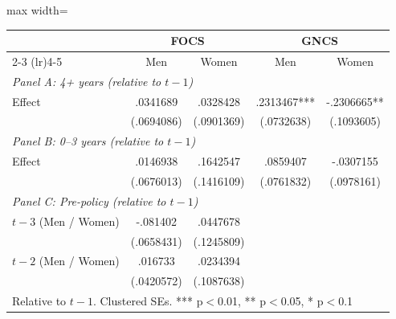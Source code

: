\begin{adjustbox}{max width=\textwidth}
\begin{tabular}{lcccc}
\toprule
 & \multicolumn{2}{c}{FOCS} & \multicolumn{2}{c}{GNCS} \\
\cmidrule(lr){2-3} \cmidrule(lr){4-5}
 & Men & Women & Men & Women \\
\midrule
\multicolumn{5}{l}{\textit{Panel A: 4+ years (relative to $t-1$)}} \\[0.3em]
Effect & .0341689 & .0328428 & .2313467*** & -.2306665** \\
 & (.0694086) & (.0901369) & (.0732638) & (.1093605) \\[0.5em]
\multicolumn{5}{l}{\textit{Panel B: 0--3 years (relative to $t-1$)}} \\[0.3em]
Effect & .0146938 & .1642547 & .0859407 & -.0307155 \\
 & (.0676013) & (.1416109) & (.0761832) & (.0978161) \\[0.5em]
\multicolumn{5}{l}{\textit{Panel C: Pre-policy (relative to $t-1$)}} \\[0.3em]
$t-3$ (Men / Women) & -.081402 & .0447678 & & \\
 & (.0658431) & (.1245809) & & \\
$t-2$ (Men / Women) & .016733 & .0234394 & & \\
 & (.0420572) & (.1087638) & & \\
\bottomrule
\multicolumn{5}{l}{\footnotesize Relative to $t-1$. Clustered SEs. *** p$<$0.01, ** p$<$0.05, * p$<$0.1} \\
\end{tabular}
\end{adjustbox}
